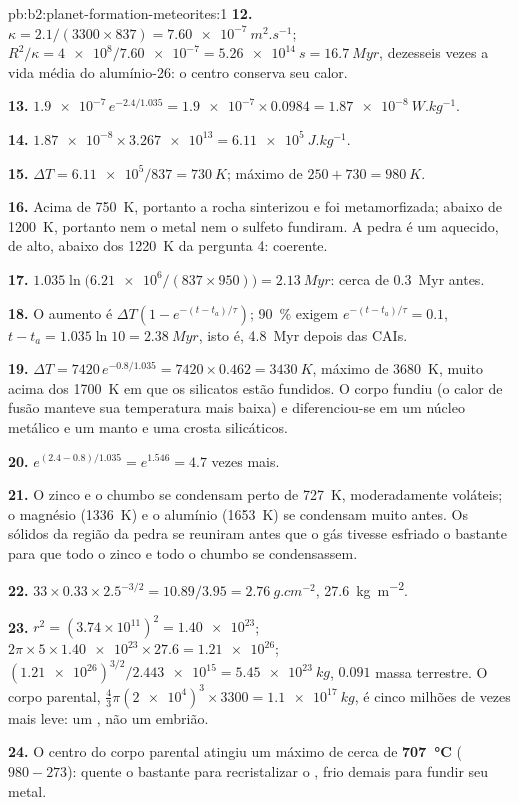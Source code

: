 \begin{solution}{pb:b2:planet-formation-meteorites:1}
\textbf{12.} $\kappa = 2.1/(3300\times837) = \qty{7.60e-7}{m^2.s^{-1}}$;
$R^2/\kappa = \num{4e8}/\num{7.60e-7} = \qty{5.26e14}{s} = \qty{16.7}{Myr}$, dezesseis
vezes a vida média do alumínio-26: o centro conserva seu calor.

\textbf{13.} $\num{1.9e-7}\,e^{-2.4/1.035} = \num{1.9e-7}\times0.0984 =
\qty{1.87e-8}{W.kg^{-1}}$.

\textbf{14.} $\num{1.87e-8}\times\num{3.267e13} = \qty{6.11e5}{J.kg^{-1}}$.

\textbf{15.} $\Delta T = \num{6.11e5}/837 = \qty{730}{K}$; máximo de
$250 + 730 = \qty{980}{K}$.

\textbf{16.} Acima de \qty{750}{K}, portanto a rocha sinterizou e foi metamorfizada; abaixo de
\qty{1200}{K}, portanto nem o metal nem o sulfeto fundiram. A pedra é um  aquecido,
de  alto, abaixo dos \qty{1220}{K} da pergunta 4: coerente.

\textbf{17.} $1.035\ln\bigl(\num{6.21e6}/(837\times950)\bigr) = \qty{2.13}{Myr}$:
cerca de \qty{0.3}{Myr} antes.

\textbf{18.} O aumento é $\Delta T(1 - e^{-(t - t_a)/\tau})$; \qty{90}{\percent}
exigem $e^{-(t - t_a)/\tau} = 0.1$, $t - t_a = 1.035\ln10 = \qty{2.38}{Myr}$, isto é,
\qty{4.8}{Myr} depois das CAIs.

\textbf{19.} $\Delta T = 7420\,e^{-0.8/1.035} = 7420\times0.462 = \qty{3430}{K}$,
máximo de \qty{3680}{K}, muito acima dos \qty{1700}{K} em que os silicatos estão fundidos.
O corpo fundiu (o calor de fusão manteve sua temperatura mais baixa) e
diferenciou-se em um núcleo metálico e um manto e uma crosta silicáticos.

\textbf{20.} $e^{(2.4 - 0.8)/1.035} = e^{1.546} = 4.7$ vezes mais.

\textbf{21.} O zinco e o chumbo se condensam perto de \qty{727}{K}, moderadamente voláteis; o magnésio
(\qty{1336}{K}) e o alumínio (\qty{1653}{K}) se condensam muito antes. Os sólidos da
região da pedra se reuniram antes que o gás tivesse esfriado o bastante para que todo o zinco e
todo o chumbo se condensassem.

\textbf{22.} $33\times0.33\times2.5^{-3/2} = 10.89/3.95 = \qty{2.76}{g.cm^{-2}}$,
\qty{27.6}{kg.m^{-2}}.

\textbf{23.} $r^2 = (3.74\times10^{11})^2 = \num{1.40e23}$;
$2\pi\times5\times\num{1.40e23}\times27.6 = \num{1.21e26}$;
$(\num{1.21e26})^{3/2}/\num{2.443e15} = \qty{5.45e23}{kg}$, $0.091$ massa terrestre.
O corpo parental, $\tfrac43\pi(\num{2e4})^3\times3300 = \qty{1.1e17}{kg}$, é cinco
milhões de vezes mais leve: um , não um embrião.

\textbf{24.} O centro do corpo parental atingiu um máximo de cerca de
\textbf{\qty[text-series-to-math=true]{707}{\degreeCelsius}} ($980 - 273$): quente o bastante para
recristalizar o , frio demais para fundir seu metal.
\end{solution}
